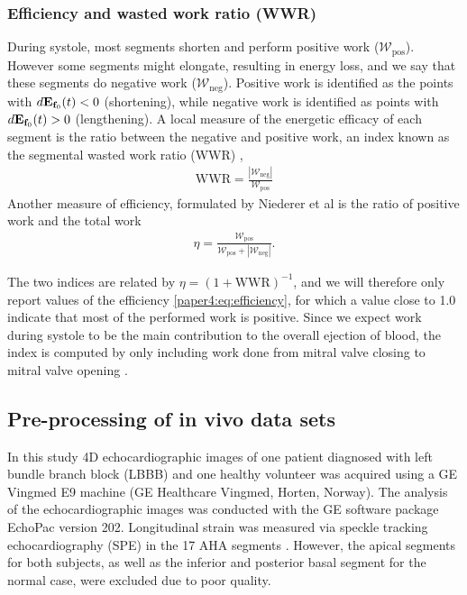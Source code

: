 \subsubsection{Efficiency and wasted work ratio (WWR)}
\label{paper4:sec:efficiency_wwr}

During systole, most segments shorten and perform positive work
($\mathcal{W}_{\mathrm{pos}}$). However some segments might elongate,
resulting in energy loss, and we say that these segments do negative work
($\mathcal{W}_{\mathrm{neg}}$). Positive work is identified as the points with
$d\mathbf{E}_{\mathbf{f}_0}(t) < 0$ (shortening), while negative work is identified as points with
$d\mathbf{E}_{\mathbf{f}_0}(t) > 0$ (lengthening).
A local measure of the energetic efficacy of each segment is the ratio between the
negative and positive work, an index known as the segmental wasted
work ratio (WWR) \cite{russell2013assessment},
\begin{align}
  \mathrm{WWR} = \frac{|\mathcal{W}_{\mathrm{neg}}|}{\mathcal{W}_{\mathrm{pos}}}
\end{align}
Another measure of efficiency, formulated by Niederer et al
\cite{niederer2009role} is the ratio of positive work and the total
work
\begin{align}
  \eta = \frac{\mathcal{W}_{\mathrm{pos}}}{\mathcal{W}_{\mathrm{pos}} + |\mathcal{W}_{\mathrm{neg}}|}.
  \label{paper4:eq:efficiency}
\end{align}

The two indices are related by $\eta = \left( 1 +
  \mathrm{WWR} \right)^{-1}$, and we will therefore only report values
of the efficiency \eqref{paper4:eq:efficiency}, for which a value close to 1.0 indicate that most
of the performed work is positive. Since we expect work during systole
to be the main contribution to the overall ejection of blood, the
index is computed by only including work done from mitral valve closing to
mitral valve opening \cite{russell2013assessment}. 


\subsection{Pre-processing of in vivo data sets}

In this study 4D echocardiographic images of one patient diagnosed
with left bundle branch block (LBBB) and one healthy volunteer was
acquired using a GE Vingmed E9 machine (GE Healthcare Vingmed, Horten,
Norway). 
The analysis of the echocardiographic images was conducted with the
GE software package EchoPac version 202. Longitudinal strain was
measured via speckle tracking echocardiography (SPE) in the 17 AHA segments
\cite{cerqueira2002standardized}. However, the apical segments for both
subjects, as well as the inferior and posterior basal segment for the
normal case, were excluded due to poor quality.

